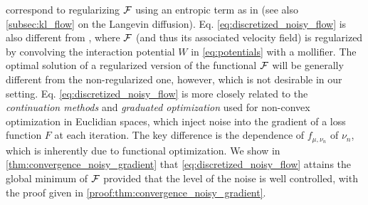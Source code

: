  correspond to regularizing ${{\mathcal F}}$ using an entropic term as in \cite{mei2018mean,csimcsekli2018sliced} (see also \cref{subsec:kl_flow} on the Langevin diffusion). Eq. \cref{eq:discretized_noisy_flow} is also different from \cite{craig2016blob,carrillo2019blob}, where ${{\mathcal F}}$ (and thus its associated velocity field) is regularized by convolving the interaction potential $W$ in \cref{eq:potentials} with a mollifier. The optimal solution of a regularized version of the functional ${{\mathcal F}}$ will be generally different from the non-regularized one, however, which is not desirable in our setting. 
Eq. \cref{eq:discretized_noisy_flow} is more  closely related to the \textit{continuation methods} \cite{Gulcehre:2016a,Gulcehre:2016,Chaudhari:2017}  and \textit{graduated optimization} \cite{Hazan:2015} used for non-convex optimization in Euclidian spaces, which inject noise into the gradient of a loss function $F$ at each iteration. The key difference is the dependence of $f_{\mu,\nu_n}$ of $\nu_n$,  which is inherently due to functional optimization.    
We show in \cref{thm:convergence_noisy_gradient} that \cref{eq:discretized_noisy_flow} attains the global minimum of ${{\mathcal F}}$ provided that the level of the noise is well controlled, with the proof given in \cref{proof:thm:convergence_noisy_gradient}.
